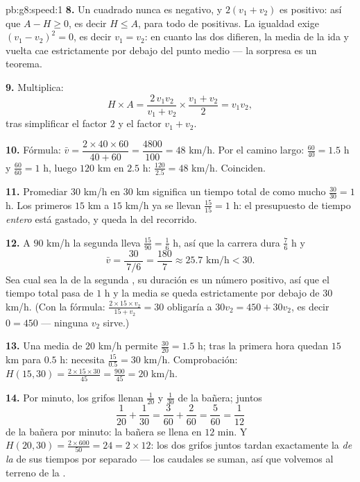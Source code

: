 \begin{solution}{pb:g8:speed:1}
\textbf{8.} Un cuadrado nunca es negativo, y $2(v_1 + v_2)$ es
positivo: así que $A - H \geq 0$, es decir $H \leq A$, para todo 
de  positivas. La igualdad exige $(v_1 - v_2)^2 = 0$, es decir
$v_1 = v_2$: en cuanto las dos  difieren, la media de la
ida y vuelta cae estrictamente por debajo del punto medio --- la sorpresa es un
teorema.

\textbf{9.} Multiplica:
\[
H \times A
= \frac{2\, v_1 v_2}{v_1 + v_2} \times \frac{v_1 + v_2}{2}
= v_1 v_2 ,
\]
tras simplificar el factor $2$ y el factor $v_1 + v_2$.

\textbf{10.} Fórmula: $\bar v = \dfrac{2 \times 40 \times 60}
{40 + 60} = \dfrac{4800}{100} = 48$ km/h. Por el camino largo:
$\frac{60}{40} = 1.5$ h y $\frac{60}{60} = 1$ h, luego $120$ km en
$2.5$ h: $\frac{120}{2.5} = 48$ km/h. Coinciden.

\textbf{11.} Promediar $30$ km/h en $30$ km significa un tiempo total
de como mucho $\frac{30}{30} = 1$ h. Los primeros $15$ km a $15$ km/h
ya se llevan $\frac{15}{15} = 1$ h: el presupuesto de tiempo \emph{entero}
está gastado, y queda la  del recorrido.

\textbf{12.} A $90$ km/h la segunda  lleva
$\frac{15}{90} = \frac16$ h, así que la carrera dura $\frac76$ h y
\[
\bar v = \frac{30}{\ 7/6\ } = \frac{180}{7} \approx 25.7
\text{ km/h} < 30 .
\]
Sea cual sea la  de la segunda , su duración es un número
positivo, así que el tiempo total pasa de $1$ h y la media se queda
estrictamente por debajo de $30$ km/h. (Con la fórmula: $\frac{2 \times 15
\times v_2}{15 + v_2} = 30$ obligaría a $30 v_2 = 450 + 30 v_2$,
es decir $0 = 450$ --- ninguna  $v_2$ sirve.)

\textbf{13.} Una media de $20$ km/h permite $\frac{30}{20} = 1.5$ h;
tras la primera hora quedan $15$ km para $0.5$ h: necesita
$\frac{15}{0.5} = 30$ km/h. Comprobación:
$H(15, 30) = \frac{2 \times 15 \times 30}{45} = \frac{900}{45}
= 20$ km/h.

\textbf{14.} Por minuto, los grifos llenan $\frac{1}{20}$ y
$\frac{1}{30}$ de la bañera; juntos
\[
\frac{1}{20} + \frac{1}{30}
= \frac{3}{60} + \frac{2}{60}
= \frac{5}{60} = \frac{1}{12}
\]
de la bañera por minuto: la bañera se llena en $12$ min. Y
$H(20, 30) = \frac{2 \times 600}{50} = 24 = 2 \times 12$: los dos
grifos juntos tardan exactamente la \emph{ de la } de sus
tiempos por separado --- los caudales se suman, así que volvemos al terreno de la .


\end{solution}
